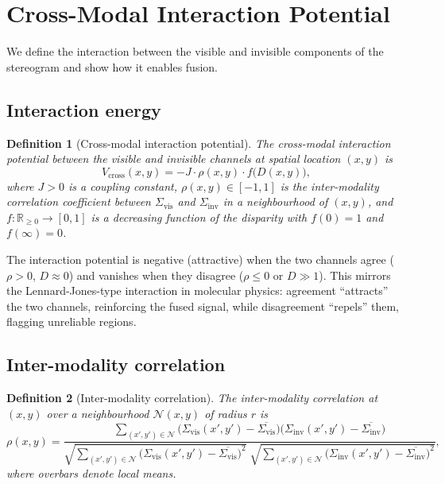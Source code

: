 \documentclass[11pt,twocolumn,a4paper]{article}
\newtheorem{definition}{Definition}
\newcommand{\Sigvis}{\Sigma_{\mathrm{vis}}}
\newcommand{\Siginv}{\Sigma_{\mathrm{inv}}}
\newcommand{\R}{\mathbb{R}}
\begin{document}
\section{Cross-Modal Interaction Potential}\label{sec:interaction}

We define the interaction between the visible and invisible components of the stereogram and show how it enables fusion.

\subsection{Interaction energy}

\begin{definition}[Cross-modal interaction potential]\label{def:interaction}
The cross-modal interaction potential between the visible and invisible channels at spatial location $(x,y)$ is
\begin{equation}\label{eq:interaction}
V_{\mathrm{cross}}(x,y) = -J \cdot \rho(x,y) \cdot f\bigl(D(x,y)\bigr),
\end{equation}
where $J > 0$ is a coupling constant, $\rho(x,y) \in [-1,1]$ is the inter-modality correlation coefficient between $\Sigvis$ and $\Siginv$ in a neighbourhood of $(x,y)$, and $f: \R_{\geq 0} \to [0,1]$ is a decreasing function of the disparity with $f(0) = 1$ and $f(\infty) = 0$.
\end{definition}

The interaction potential is negative (attractive) when the two channels agree ($\rho > 0$, $D \approx 0$) and vanishes when they disagree ($\rho \leq 0$ or $D \gg 1$).
This mirrors the Lennard-Jones-type interaction \citep{Jones1924} in molecular physics: agreement ``attracts'' the two channels, reinforcing the fused signal, while disagreement ``repels'' them, flagging unreliable regions.

\subsection{Inter-modality correlation}

\begin{definition}[Inter-modality correlation]\label{def:correlation}
The inter-modality correlation at $(x,y)$ over a neighbourhood $\mathcal{N}(x,y)$ of radius $r$ is
\begin{equation}\label{eq:correlation}
\rho(x,y) = \frac{\sum_{(x',y') \in \mathcal{N}} \bigl(\Sigvis(x',y') - \overline{\Sigvis}\bigr)\bigl(\Siginv(x',y') - \overline{\Siginv}\bigr)}{\sqrt{\sum_{(x',y') \in \mathcal{N}} \bigl(\Sigvis(x',y') - \overline{\Sigvis}\bigr)^2}\;\sqrt{\sum_{(x',y') \in \mathcal{N}} \bigl(\Siginv(x',y') - \overline{\Siginv}\bigr)^2}},
\end{equation}
where overbars denote local means.
\end{definition}
\end{document}
